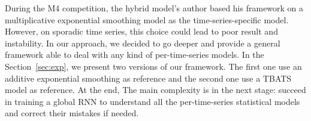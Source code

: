 \documentclass{article} %
\newcommand{\ts}{y}
\newcommand{\fullts}{{\bf \ts}}
\newcommand{\lag}{h}
\begin{document}
During the M4 competition, the hybrid model's author based his framework on a multiplicative exponential smoothing model as the time-series-specific model. However, on sporadic time series, this choice could lead to poor result and instability. In our approach, we decided to go deeper and provide a general framework able to deal with any kind of per-time-series models. In the Section~\ref{sec:exp}, we present two versions of our framework. The first one use an additive exponential smoothing as reference and the second one use a TBATS model as reference. At the end, The main complexity is in the next stage: succeed in training a global RNN to understand all the per-time-series statistical models and correct their mistakes if needed.


\end{document}
